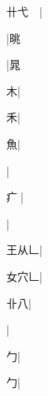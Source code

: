 \begin{multicols}{2}
{{\cjk{}卄弋{\cnsym{}　}}|{}\par
{\cjk{}{\cnsym{}　}{\cnsym{}　}{\cnsym{}　}}|{\cjk{}晀}\par
{\cjk{}{\cnsym{}　}{\cnsym{}　}{\cnsym{}　}}|{\cjk{}晁}\par
{\cjk{}{\cnsym{}　}{\cnsym{}　}木}|{}\par
{\cjk{}{\cnsym{}　}{\cnsym{}　}禾}|{}\par
{\cjk{}{\cnsym{}　}{\cnsym{}　}魚}|{}\par
{}|{}\par
{\cjk{}{\cnsym{}　}疒{\cnxb{}𡗜}}|{}\par
{}|{}\par
{\cjk{}王从{\cnxb{}𠃊}}|{}\par
{\cjk{}女穴{\cnxb{}𠃊}}|{}\par
{\cjk{}{\cnsym{}　}卝八}|{}\par
{}|{}\par
{\cjk{}{\cnsym{}　}{\cnsym{}　}勹}|{}\par
{\cjk{}{\cnsym{}　}{\cnsym{}　}勹}|{}\par
}
\end{multicols}
